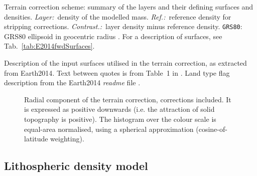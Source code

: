 \begin{table}[ht]
    \caption[Terrain correction scheme: summary of the layers and their defining surfaces and densities.]{
        Terrain correction scheme: summary of the layers and their defining surfaces and densities.
        \textit{Layer:}~density of the modelled mass.
        \textit{Ref.:}~reference density for stripping corrections.
        \textit{Contrast.:}~layer density minus reference density.
        \texttt{GRS80}: GRS80 ellipsoid in geocentric radius \parencites{Moritz1980_GRS80}{Moritz2000_GRS80}. For a description of surfaces, see Tab.~\ref{tab:E2014fwdSurfaces}.}
    \begin{adjustbox}{center}
        
    \end{adjustbox}
    \label{tab:E2014fwdLayers}
\end{table}

\begin{table}[ht]
    \caption[Description of the input surfaces utilised in the terrain correction, as extracted from {Earth2014}.]{
        Description of the input surfaces utilised in the terrain correction, as extracted from {Earth2014}. Text between quotes is from Table~1 in \textcite{Hirt2015}. Land type flag description from the {Earth2014} \textit{readme} file \parencite{Hirt2015_Earth2014readme}.}
    \begin{adjustbox}{center}
        
    \end{adjustbox}
    \label{tab:E2014fwdSurfaces}
\end{table}

\begin{figure}
    \begin{adjustbox}{center}
    \end{adjustbox}
    \caption[Radial component of the terrain correction, corrections included.]{Radial component of the terrain correction, corrections included. It is expressed as positive downwards (i.e. the attraction of solid topography is positive). The histogram over the colour scale is equal-area normalised, using a spherical approximation (cosine-of-latitude weighting).}
    \label{fig:E2014fwd_out_TC_g_rad}
\end{figure}

\subsection{Lithospheric density model}
\label{ss:SigIs:LITHOmodel}

